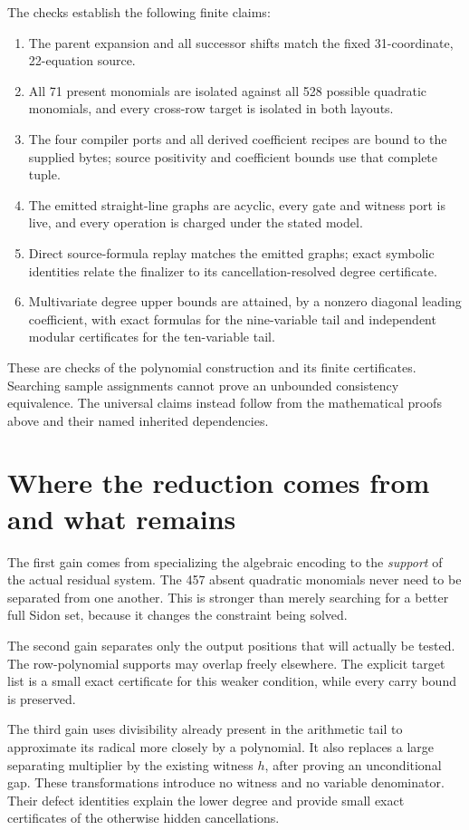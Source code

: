 \documentclass[11pt]{article}
\theoremstyle{definition}\newtheorem{definition}[theorem]{Definition}
\theoremstyle{remark}\newtheorem{remark}[theorem]{Remark}
\begin{document}
The checks establish the following finite claims:
\begin{enumerate}
\item The parent expansion and all successor shifts match the fixed
31-coordinate, 22-equation source.
\item All 71 present monomials are isolated against all 528 possible
quadratic monomials, and every cross-row target is isolated in both layouts.
\item The four compiler ports and all derived coefficient recipes are
bound to the supplied bytes; source positivity and coefficient bounds use
that complete tuple.
\item The emitted straight-line graphs are acyclic, every gate and
witness port is live, and every operation is charged under the stated model.
\item Direct source-formula replay matches the emitted graphs; exact
symbolic identities relate the finalizer to its cancellation-resolved
degree certificate.
\item Multivariate degree upper bounds are attained, by a nonzero
diagonal leading coefficient, with exact formulas for the nine-variable
tail and independent modular certificates for the ten-variable tail.
\end{enumerate}
These are checks of the polynomial construction and its finite certificates.
Searching sample assignments cannot prove an unbounded consistency
equivalence. The universal claims instead follow from the mathematical
proofs above and their named inherited dependencies.

\section{Where the reduction comes from and what remains}
The first gain comes from specializing the algebraic encoding to the
\emph{support} of the actual residual system. The 457 absent quadratic
monomials never need to be separated from one another. This is stronger
than merely searching for a better full Sidon set, because it changes
the constraint being solved.

The second gain separates only the output positions that will actually
be tested. The row-polynomial supports may overlap freely elsewhere.
The explicit target list is a small exact certificate for this weaker
condition, while every carry bound is preserved.

The third gain uses divisibility already present in the arithmetic tail
to approximate its radical more closely by a polynomial. It also replaces
a large separating multiplier by the existing witness $h$, after proving
an unconditional gap. These transformations introduce no witness and no
variable denominator. Their defect identities explain the lower degree
and provide small exact certificates of the otherwise hidden cancellations.
\end{document}
